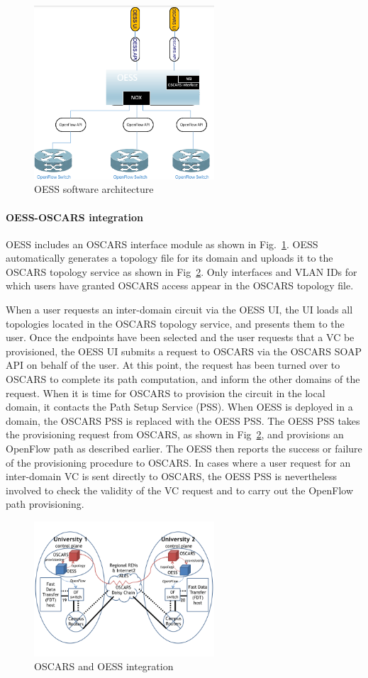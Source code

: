 \begin{figure}[htbp!]
\centering
\includegraphics[width=0.6\textwidth]{figures/ControlPlane.PNG}
\caption{OESS software architecture}
\label{fig:ControlPlane}
\end{figure}

\paragraph{OESS-OSCARS integration}
OESS includes an OSCARS interface module as shown in Fig.~\ref{fig:ControlPlane}. OESS automatically generates a
topology file for its domain and uploads it to the OSCARS
topology service as shown in Fig~\ref{fig:oscarsoess}. Only interfaces and VLAN IDs for which
users have granted OSCARS access appear in the OSCARS
topology file.

When a user requests an inter-domain circuit
via the OESS UI, the UI loads all topologies located in the
OSCARS topology service, and presents them to the user.
Once the endpoints have been selected and the user requests
that a VC be provisioned, the OESS UI submits a request to
OSCARS via the OSCARS SOAP API on behalf of the user.
At this point, the request has been turned over to OSCARS to
complete its path computation, and inform the other domains
of the request. When it is time for OSCARS to provision the
circuit in the local domain, it contacts the Path Setup Service
(PSS). When OESS is deployed in a domain, the OSCARS
PSS is replaced with the OESS PSS. The OESS PSS takes
the provisioning request from OSCARS, as shown in Fig~\ref{fig:oscarsoess}, and provisions an
OpenFlow path as described earlier. The OESS then reports the
success or failure of the provisioning procedure to OSCARS.
In cases where a user request for an inter-domain VC is sent
directly to OSCARS, the OESS PSS is nevertheless involved
to check the validity of the VC request and to carry out the
OpenFlow path provisioning.

\begin{figure}
\centering
\includegraphics[width=0.6\textwidth]{figures/oscarsoess.png}
\caption{OSCARS and OESS integration}
\label{fig:oscarsoess}
\end{figure}
